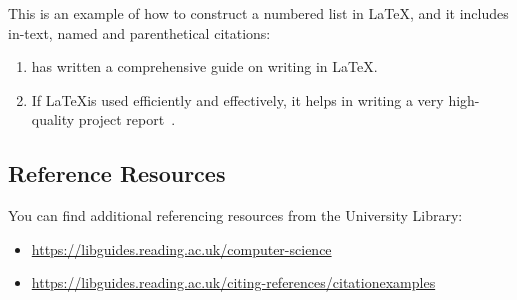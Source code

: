 \noindent 
This is an example of how to construct a numbered list in \LaTeX, and it includes in-text, named and parenthetical citations:
\begin{enumerate}
    \item \cite{kottwitzlatex2021} has written a comprehensive guide on writing in \LaTeX.
    \item If \LaTeX is used efficiently and effectively, it helps in writing a very high-quality project report~\citep{lamport1994latex}.   
\end{enumerate}

\subsection{Reference Resources}\label{subsec:reflinks}
You can find additional referencing resources from the University Library:
\begin{itemize}
    \item \url{https://libguides.reading.ac.uk/computer-science}
    \item \url{https://libguides.reading.ac.uk/citing-references/citationexamples}
\end{itemize}


% 



